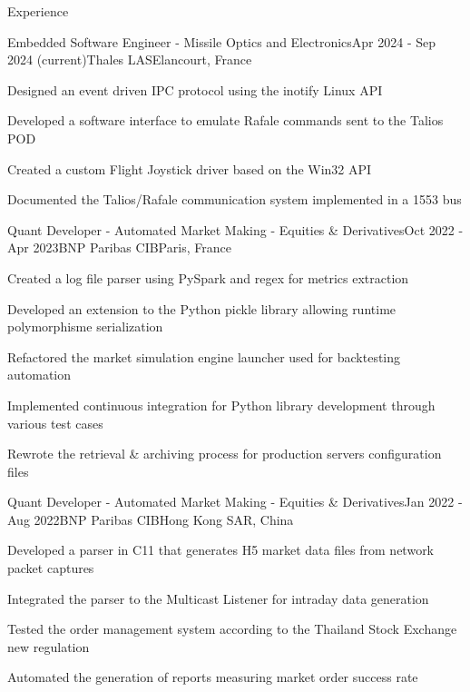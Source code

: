 \documentclass[
	a4paper, %
	10pt, %
]{resume} %
\def\CC{{C\nolinebreak[4]\hspace{-.05em}\raisebox{.4ex}{\tiny\bf ++}}}
\begin{document}
\begin{rSection}{Experience}

	\begin{rSubsection}{Embedded Software Engineer - Missile Optics and Electronics}{Apr 2024 - Sep 2024 (current)}{Thales LAS}{Elancourt, France}
    \item Designed an event driven IPC protocol using the inotify Linux API
    \item Developed a software interface to emulate Rafale commands sent to the Talios POD
    \item Created a custom Flight Joystick driver based on the Win32 API
    \item Documented the Talios/Rafale communication system implemented in a 1553 bus
	\end{rSubsection}

	\begin{rSubsection}{Quant Developer - Automated Market Making - Equities \& Derivatives}{Oct 2022 - Apr 2023}{BNP Paribas CIB}{Paris, France}
		\item Created a log file parser using PySpark and regex for metrics extraction
		\item Developed an extension to the Python pickle library allowing runtime polymorphisme serialization
		\item Refactored the market simulation engine launcher used for backtesting automation
		\item Implemented continuous integration for Python library development through various test cases
		\item Rewrote the retrieval \& archiving process for production servers configuration files
	\end{rSubsection}

	\begin{rSubsection}{Quant Developer - Automated Market Making - Equities \& Derivatives}{Jan 2022 - Aug 2022}{BNP Paribas CIB}{Hong Kong SAR, China}
    \item Developed a parser in \CC11 that generates H5 market data files from network packet captures
		\item Integrated the parser to the Multicast Listener for intraday data generation
		\item Tested the order management system according to the Thailand Stock Exchange new regulation
		\item Automated the generation of reports measuring market order success rate
	\end{rSubsection}

\end{rSection}
\end{document}
